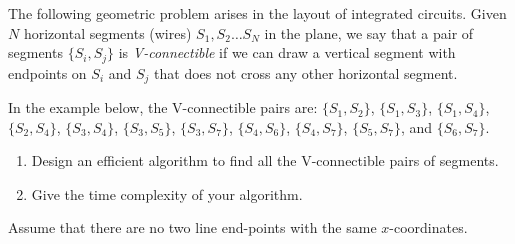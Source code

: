 The following geometric problem arises in the layout of integrated
circuits.  Given $N$ horizontal segments (wires) $S_{1}, S_{2} \ldots
S_{N}$ in the plane, we say that a pair of segments $\{ S_{i},S_{j} \}$
is {\em V-connectible} if we can draw a vertical segment with
endpoints on $S_{i}$ and $S_{j}$ that does not cross any other
horizontal segment.

In the example below, the V-connectible pairs are:
$\{ S_1 , S_2 \}$,
$\{ S_1 , S_ 3\}$,
$\{ S_1 , S_4 \}$,
$\{ S_2 , S_4 \}$,
$\{ S_3 , S_4 \}$,
$\{ S_3 , S_5 \}$,
$\{ S_3 , S_7 \}$,
$\{ S_4 , S_6 \}$,
$\{ S_4 , S_7 \}$,
$\{ S_5 , S_7 \}$,
and
$\{ S_6 , S_7 \}$.


\vspace{4mm}
\par
\begin{figure}[h]
\centerline{}\end{figure}

\par
\vspace{4mm}

\begin{enumerate}

\item  Design an efficient algorithm to find all the V-connectible pairs of segments.

\item  Give the time complexity of your algorithm.

\end{enumerate}

Assume that  there are no two line end-points with the same $x$-coordinates.
